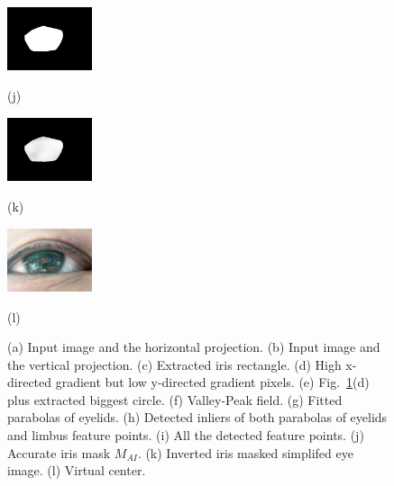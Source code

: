\documentclass[sigconf]{acmart}
\begin{document}
\begin{figure}[t]
\begin{minipage}[b]{0.32\linewidth}
  \centering
  \centerline{\includegraphics[width=2.5cm]{../Fig/ExactIrisCenter/FeaturePoints_LimbusFtPtsConvexHull.jpg}}
  \centerline{(j)}\medskip
\end{minipage}
\hfill
\begin{minipage}[b]{0.32\linewidth}
  \centering
  \centerline{\includegraphics[width=2.5cm]{../Fig/ExactIrisCenter/MomentCenterByGrayLevel.jpg}}
  \centerline{(k)}\medskip
\end{minipage}
\hfill
\begin{minipage}[b]{0.34\linewidth}
  \centering
  \centerline{\includegraphics[width=2.5cm]{../Fig/ExactIrisCenter/EyePosition_CenterResult.jpg}}
  \centerline{(l)}\medskip
\end{minipage}


\caption{(a) Input image and the horizontal projection. (b) Input image and the vertical projection. (c) Extracted iris rectangle. (d) High x-directed gradient but low y-directed gradient pixels. (e) Fig.~\ref{fig:ova}(d) plus extracted biggest circle. (f) Valley-Peak field. (g) Fitted parabolas of eyelids. (h) Detected inliers of both parabolas of eyelids and limbus feature points. (i) All the detected feature points. (j) Accurate iris mask $M_{AI}$. (k) Inverted iris masked simplifed eye image. (l) Virtual center.}
\label{fig:ova}
\end{figure}
\end{document}
